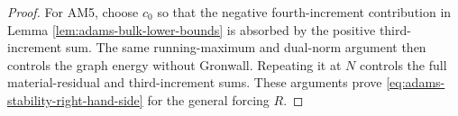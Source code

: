 \documentclass[10pt,a4paper]{amsart}
\begin{document}
\begin{proof}
For AM5, choose \(c_0\) so that the negative fourth-increment contribution
in Lemma \ref{lem:adams-bulk-lower-bounds} is absorbed by the positive
third-increment sum. The same running-maximum and dual-norm argument then
controls the graph energy without Gronwall. Repeating it at \(N\) controls
the full material-residual and third-increment sums. These arguments prove
\eqref{eq:adams-stability-right-hand-side} for the general forcing \(R\).
\end{proof}
\end{document}
